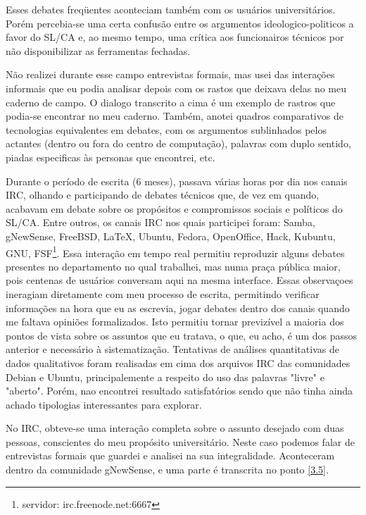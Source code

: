 Esses debates freqüentes aconteciam também com os usuários universitários. Por\'em percebia-se uma certa confus\~ao entre os argumentos ideologico-politicos a favor do SL/CA e, ao mesmo tempo, uma cr\'itica aos funcionairos t\'ecnicos por não disponibilizar as ferramentas fechadas. 

Não realizei durante esse campo entrevistas formais, mas usei das interações informais que eu podia analisar depois com os rastos que deixava delas no meu caderno de campo. O dialogo transcrito a cima é um exemplo de rastros que podia-se encontrar no meu caderno. Também, anotei quadros comparativos de tecnologias equivalentes em debates, com os argumentos sublinhados pelos actantes (dentro ou fora do centro de computa\c c\~ao), palavras com duplo sentido, piadas especificas às personas que encontrei, etc.

Durante o período de escrita (6 meses), passava v\'arias horas por dia nos canais IRC, olhando e participando de debates técnicos que, de vez em quando, acabavam em debate sobre os propósitos e compromissos sociais e políticos do SL/CA. Entre outros, os canais IRC nos quais participei foram: Samba, gNewSense, FreeBSD, LaTeX, Ubuntu, Fedora, OpenOffice, Hack, Kubuntu, GNU, FSF\footnote{servidor: irc.freenode.net:6667}. Essa interação em tempo real permitiu reproduzir alguns debates presentes no departamento no qual trabalhei, mas numa praça pública maior, pois centenas de usuários conversam aqui na mesma interface. Essas observaçoes ineragiam diretamente com meu processo de escrita, permitindo verificar informaç\~oes na hora que eu as escrevia, jogar debates dentro dos canais quando me faltava opini\~oes formalizados. Isto permitiu tornar previz\'ivel a maioria dos pontos de vista sobre os assuntos que eu tratava, o que, eu acho, é um dos passos anterior e necess\'ario à sistematizaç\~ao. Tentativas de an\'alises quantitativas de dados qualitativos foram realisadas em cima dos arquivos IRC das comunidades Debian e Ubuntu, principalemente a respeito do uso das palavras "livre" e "aberto". Porém, nao encontrei resultado satisfat\'orios sendo que n\~ao tinha ainda achado tipologias interessantes para explorar.

No IRC, obteve-se uma interação completa sobre o assunto desejado com duas pessoas, conscientes do meu propósito universitário. Neste caso podemos falar de entrevistas formais que guardei  e analisei na sua integralidade. Aconteceram dentro da comunidade gNewSense, e uma parte é transcrita no ponto \ref{3.5}.

